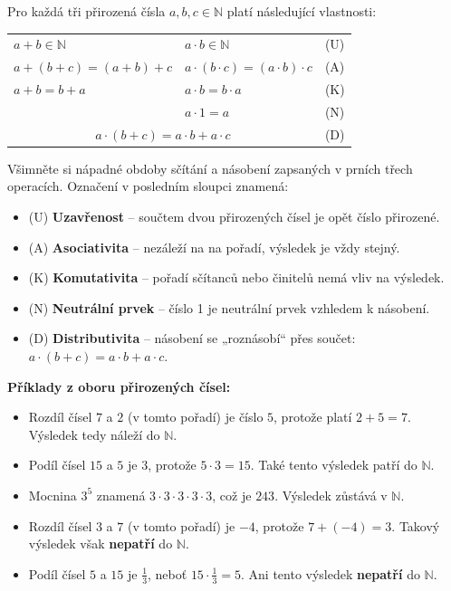 \documentclass[12pt,a4paper]{article}
\begin{document}
\begin{definitionbox}
Pro každá tři přirozená čísla $a, b, c \in \mathbb{N}$ platí následující vlastnosti:

\begin{tabular}{p{5cm} p{4cm} p{2cm}}

$a+b \in \mathbb{N}$ & $a \cdot b \in \mathbb{N}$ & \hfill(U) \\
$a+(b+c) = (a+b)+c$ & $a \cdot (b \cdot c) = (a \cdot b)\cdot c$ & \hfill(A) \\
$a+b = b+a$ & $a \cdot b = b \cdot a$ & \hfill(K) \\
 & $a \cdot 1 = a$ & \hfill(N)\\
\multicolumn{2}{c}{ $a \cdot (b+c) = a\cdot b + a\cdot c$ } & \hfill(D) \\
\end{tabular}
\end{definitionbox}

Všimněte si nápadné obdoby sčítání a násobení zapsaných v prních třech operacích. Označení v posledním sloupci znamená:

\noindent
\begin{itemize}
    \item (U) \textbf{Uzavřenost} – součtem dvou přirozených čísel je opět číslo přirozené.
    \item (A) \textbf{Asociativita} – nezáleží na na pořadí, výsledek je vždy stejný.
    \item (K) \textbf{Komutativita} – pořadí sčítanců nebo činitelů nemá vliv na výsledek.
    \item (N) \textbf{Neutrální prvek} – číslo 1 je neutrální prvek vzhledem k násobení.
    \item (D) \textbf{Distributivita} – násobení se „roznásobí“ přes součet: $a\cdot(b+c)=a\cdot b+a\cdot c$.
\end{itemize}

\begin{examplebox}
\textbf{Příklady z oboru přirozených čísel:}

\begin{itemize}
    \item Rozdíl čísel $7$ a $2$ (v tomto pořadí) je číslo $5$, protože platí $2+5=7$. Výsledek tedy náleží do $\mathbb{N}$.
    \item Podíl čísel $15$ a $5$ je $3$, protože $5 \cdot 3 = 15$. Také tento výsledek patří do $\mathbb{N}$.
    \item Mocnina $3^5$ znamená $3 \cdot 3 \cdot 3 \cdot 3 \cdot 3$, což je $243$. Výsledek zůstává v $\mathbb{N}$.
    \item Rozdíl čísel $3$ a $7$ (v tomto pořadí) je $-4$, protože $7 + (-4) = 3$. Takový výsledek však \textbf{nepatří} do $\mathbb{N}$.
    \item Podíl čísel $5$ a $15$ je $\tfrac{1}{3}$, neboť $15 \cdot \tfrac{1}{3} = 5$. Ani tento výsledek \textbf{nepatří} do $\mathbb{N}$.
\end{itemize}
\end{examplebox}
\end{document}
